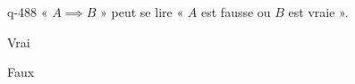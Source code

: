 \begin{truefalse}{q-488}
« $A \implies B$ » peut se lire « $A$ est fausse ou $B$ est vraie ».
\item* Vrai
\item Faux
\end{truefalse}

